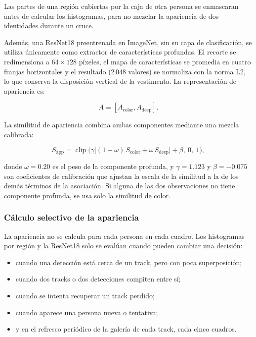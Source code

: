 \documentclass[12pt,letterpaper]{article}
\begin{document}
Las partes de una región cubiertas por la caja de otra persona se
enmascaran antes de calcular los histogramas, para no mezclar la
apariencia de dos identidades durante un cruce.

Además, una ResNet18 preentrenada en ImageNet, sin su capa de
clasificación, se utiliza únicamente como extractor de características
profundas. El recorte se redimensiona a $64\times128$ píxeles, el mapa
de características se promedia en cuatro franjas horizontales y el
resultado (2\,048 valores) se normaliza con la norma L2, lo que conserva
la disposición vertical de la vestimenta. La representación de
apariencia es:

\begin{equation}
A=[A_{\text{color}},A_{\text{deep}}].
\end{equation}

La similitud de apariencia combina ambas componentes mediante una mezcla
calibrada:

\begin{equation}
S_{\text{app}}=
\operatorname{clip}\!\Big(
\gamma\big[(1-\omega)\,S_{\text{color}}+\omega\,S_{\text{deep}}\big]
+\beta,\ 0,\ 1
\Big),
\end{equation}

donde $\omega=0.20$ es el peso de la componente profunda, y $\gamma=1.123$
y $\beta=-0.075$ son coeficientes de calibración que ajustan la escala de
la similitud a la de los demás términos de la asociación. Si alguna de
las dos observaciones no tiene componente profunda, se usa solo la
similitud de color.

\subsubsection{Cálculo selectivo de la apariencia}

La apariencia no se calcula para cada persona en cada cuadro. Los
histogramas por región y la ResNet18 solo se evalúan cuando pueden
cambiar una decisión:

\begin{itemize}
    \item cuando una detección está cerca de un track, pero con poca
    superposición;
    \item cuando dos tracks o dos detecciones compiten entre sí;
    \item cuando se intenta recuperar un track perdido;
    \item cuando aparece una persona nueva o tentativa;
    \item y en el refresco periódico de la galería de cada track, cada
    cinco cuadros.
\end{itemize}
\end{document}

